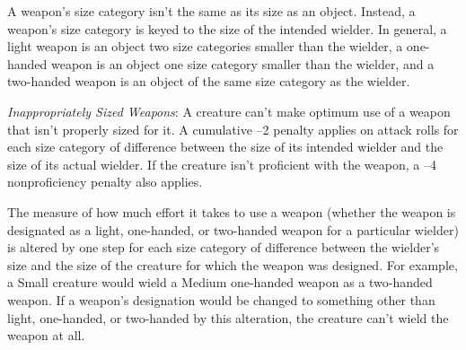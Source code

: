 A weapon's size category isn't the same as its size as an object. Instead, a weapon's size category is keyed to the size of the intended wielder. In general, a light weapon is an object two size categories smaller than the wielder, a one-handed weapon is an object one size category smaller than the wielder, and a two-handed weapon is an object of the same size category as the wielder.
		
\textit{Inappropriately Sized Weapons}: A creature can't make optimum use of a weapon that isn't properly sized for it. A cumulative --2 penalty applies on attack rolls for each size category of difference between the size of its intended wielder and the size of its actual wielder. If the creature isn't proficient with the weapon, a --4 nonproficiency penalty also applies.
		
The measure of how much effort it takes to use a weapon (whether the weapon is designated as a light, one-handed, or two-handed weapon for a particular wielder) is altered by one step for each size category of difference between the wielder's size and the size of the creature for which the weapon was designed. For example, a Small creature would wield a Medium one-handed weapon as a two-handed weapon. If a weapon's designation would be changed to something other than light, one-handed, or two-handed by this alteration, the creature can't wield the weapon at all.
		
